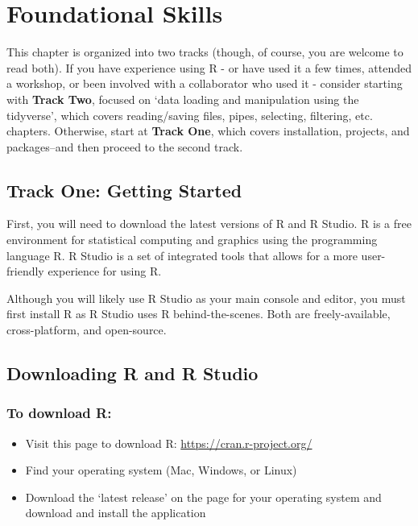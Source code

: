 \documentclass[]{book}
\providecommand{\tightlist}{%
  \setlength{\itemsep}{0pt}\setlength{\parskip}{0pt}}
\begin{document}
\chapter{Foundational Skills}\label{foundational-skills}

This chapter is organized into two tracks (though, of course, you are
welcome to read both). If you have experience using R - or have used it
a few times, attended a workshop, or been involved with a collaborator
who used it - consider starting with \textbf{Track Two}, focused on
`data loading and manipulation using the tidyverse', which covers
reading/saving files, pipes, selecting, filtering, etc. chapters.
Otherwise, start at \textbf{Track One}, which covers installation,
projects, and packages--and then proceed to the second track.

\section{Track One: Getting Started}\label{track-one-getting-started}

First, you will need to download the latest versions of R and R Studio.
R is a free environment for statistical computing and graphics using the
programming language R. R Studio is a set of integrated tools that
allows for a more user-friendly experience for using R.

Although you will likely use R Studio as your main console and editor,
you must first install R as R Studio uses R behind-the-scenes. Both are
freely-available, cross-platform, and open-source.

\section{Downloading R and R Studio}\label{downloading-r-and-r-studio}

\subsection{To download R:}\label{to-download-r}

\begin{itemize}
\tightlist
\item
  Visit this page to download R: \url{https://cran.r-project.org/}
\item
  Find your operating system (Mac, Windows, or Linux)
\item
  Download the `latest release' on the page for your operating system
  and download and install the application
\end{itemize}
\end{document}
